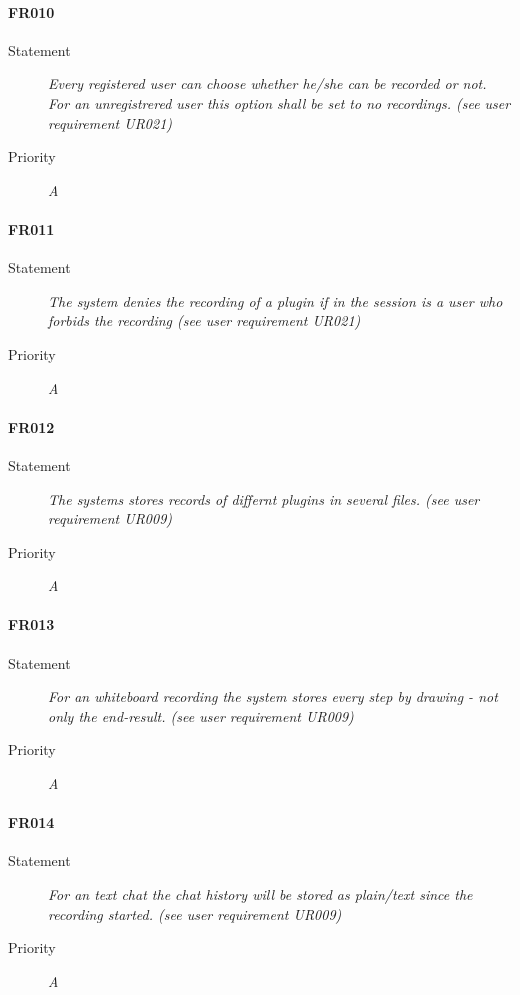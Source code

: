 \paragraph{FR010}
\begin{description}
  \item [Statement] 
    \textit{Every registered user can choose whether he/she can be recorded or not. For an unregistrered user this option shall be set to no recordings.
    (see user requirement UR021)}
  \item [Priority] \textit{A}
\end{description}

\paragraph{FR011}
\begin{description}
  \item [Statement] 
    \textit{The system denies the recording of a plugin if in the session is a user who forbids the recording
    (see user requirement UR021)}
  \item [Priority] \textit{A}
\end{description}

\paragraph{FR012}
\begin{description}
  \item [Statement] 
    \textit{The systems stores records of differnt plugins in several files.
    (see user requirement UR009)}
  \item [Priority] \textit{A}
\end{description}

\paragraph{FR013}
\begin{description}
  \item [Statement] 
    \textit{For an whiteboard recording the system stores every step by drawing - not only the end-result.
    (see user requirement UR009)}
  \item [Priority] \textit{A}
\end{description}

\paragraph{FR014}
\begin{description}
  \item [Statement] 
    \textit{For an text chat the chat history will be stored as plain/text since the recording started.
    (see user requirement UR009)}
  \item [Priority] \textit{A}
\end{description}

